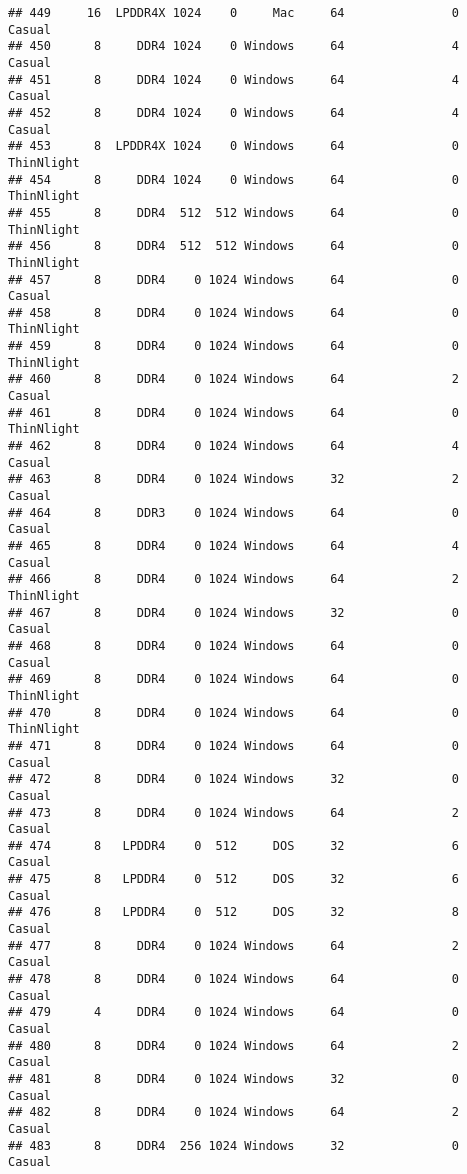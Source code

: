 \documentclass[
]{article}
\begin{document}
\begin{verbatim}
## 449     16  LPDDR4X 1024    0     Mac     64               0     Casual
## 450      8     DDR4 1024    0 Windows     64               4     Casual
## 451      8     DDR4 1024    0 Windows     64               4     Casual
## 452      8     DDR4 1024    0 Windows     64               4     Casual
## 453      8  LPDDR4X 1024    0 Windows     64               0 ThinNlight
## 454      8     DDR4 1024    0 Windows     64               0 ThinNlight
## 455      8     DDR4  512  512 Windows     64               0 ThinNlight
## 456      8     DDR4  512  512 Windows     64               0 ThinNlight
## 457      8     DDR4    0 1024 Windows     64               0     Casual
## 458      8     DDR4    0 1024 Windows     64               0 ThinNlight
## 459      8     DDR4    0 1024 Windows     64               0 ThinNlight
## 460      8     DDR4    0 1024 Windows     64               2     Casual
## 461      8     DDR4    0 1024 Windows     64               0 ThinNlight
## 462      8     DDR4    0 1024 Windows     64               4     Casual
## 463      8     DDR4    0 1024 Windows     32               2     Casual
## 464      8     DDR3    0 1024 Windows     64               0     Casual
## 465      8     DDR4    0 1024 Windows     64               4     Casual
## 466      8     DDR4    0 1024 Windows     64               2 ThinNlight
## 467      8     DDR4    0 1024 Windows     32               0     Casual
## 468      8     DDR4    0 1024 Windows     64               0     Casual
## 469      8     DDR4    0 1024 Windows     64               0 ThinNlight
## 470      8     DDR4    0 1024 Windows     64               0 ThinNlight
## 471      8     DDR4    0 1024 Windows     64               0     Casual
## 472      8     DDR4    0 1024 Windows     32               0     Casual
## 473      8     DDR4    0 1024 Windows     64               2     Casual
## 474      8   LPDDR4    0  512     DOS     32               6     Casual
## 475      8   LPDDR4    0  512     DOS     32               6     Casual
## 476      8   LPDDR4    0  512     DOS     32               8     Casual
## 477      8     DDR4    0 1024 Windows     64               2     Casual
## 478      8     DDR4    0 1024 Windows     64               0     Casual
## 479      4     DDR4    0 1024 Windows     64               0     Casual
## 480      8     DDR4    0 1024 Windows     64               2     Casual
## 481      8     DDR4    0 1024 Windows     32               0     Casual
## 482      8     DDR4    0 1024 Windows     64               2     Casual
## 483      8     DDR4  256 1024 Windows     32               0     Casual

\end{verbatim}
\end{document}

